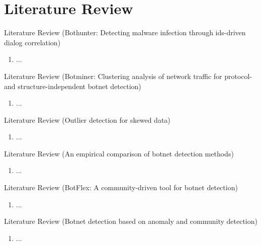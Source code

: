 \documentclass[newPxFont, numfooter, sectionpages]{beamer}
\begin{document}
\section{Literature Review}

\begin{frame}[c]{Literature Review}
	\cite{gu2007bothunter} (Bothunter: Detecting malware infection through ids-driven dialog correlation)
	\begin{enumerate}
		\item ...
	\end{enumerate}	
\end{frame}

\begin{frame}[c]{Literature Review}
	\cite{gu2008botminer} (Botminer: Clustering analysis of network traffic for protocol-and structure-independent botnet detection)
	\begin{enumerate}
		\item ...
	\end{enumerate}	
\end{frame}

\begin{frame}[c]{Literature Review}
	\cite{hubert2008outlier} (Outlier detection for skewed data)
	\begin{enumerate}
		\item ...
	\end{enumerate}	
\end{frame}

\begin{frame}[c]{Literature Review}
	\cite{garcia2014empirical} (An empirical comparison of botnet detection methods)
	\begin{enumerate}
		\item ...
	\end{enumerate}	
\end{frame}

\begin{frame}[c]{Literature Review}
	\cite{khattak2015botflex} (BotFlex: A community-driven tool for botnet detection)
	\begin{enumerate}
		\item ...
	\end{enumerate}	
\end{frame}

\begin{frame}[c]{Literature Review}
	\cite{wang2017botnet} (Botnet detection based on anomaly and community detection)
	\begin{enumerate}
		\item ...
	\end{enumerate}	
\end{frame}
\end{document}
